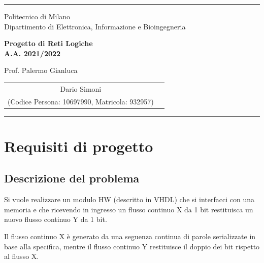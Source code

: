 \documentclass{article}
\begin{document}
\setlength\parindent{0pt} %
\setlength\parskip{1em}

\begin{titlepage}
    \centering
    \hrule

    \vspace{0,5cm}
    {
        \normalsize Politecnico di Milano\\
        Dipartimento di Elettronica, Informazione e Bioingegneria
    }

    \vspace{5cm}
    {\Huge \textbf{Progetto di Reti Logiche\\
            A.A. 2021/2022}\\}

    \vspace{0,5cm}
    \large {Prof. Palermo Gianluca}

    \vspace{5cm}
    {
        \large
        \begin{tabular}{c c}
            Dario Simoni \\
            (Codice Persona: 10697990, Matricola: 932957) \\
        \end{tabular}

    }

    \vspace{6.5cm}


    \hrule

\end{titlepage}

\pagebreak

\tableofcontents

\pagebreak

\section{Requisiti di progetto} %
\subsection{Descrizione del problema} %
Si vuole realizzare un modulo HW (descritto in VHDL) che si interfacci con una memoria e che
ricevendo in ingresso un flusso continuo X da 1 bit restituisca un nuovo flusso continuo Y da 1 bit.
\par
Il flusso continuo X è generato da una seguenza continua di parole serializzate in base alla specifica, mentre il flusso continuo Y restituisce il doppio dei bit rispetto al flusso X.
\vspace{0,2cm} %
\end{document}
